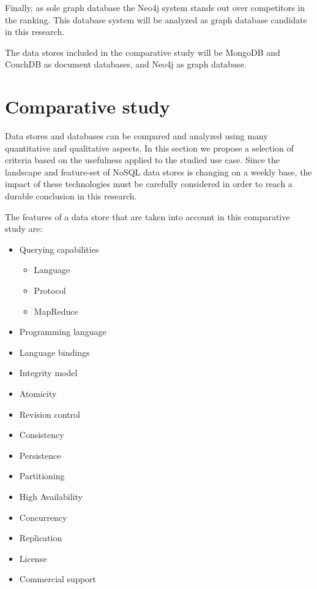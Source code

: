 \clearpage{}
Finally, as sole graph database the Neo4j system \autocite{Neo4j2007} stands out over competitors in the ranking.
This database system will be analyzed as graph database candidate in this research.

The data stores included in the comparative study will be MongoDB and CouchDB as document databases, and Neo4j as graph database.

\section{Comparative study}
\label{sec:comparative-study}

Data stores and databases can be compared and analyzed using many quantitative and qualitative aspects.
In this section we propose a selection of criteria based on the usefulness applied to the studied use case.
Since the landscape and feature-set of NoSQL data stores is changing on a weekly base, the impact of these technologies must be carefully considered in order to reach a durable conclusion in this research.

The features of a data store that are taken into account in this comparative study are:

\begin{itemize}
  \item Querying capabilities
    \begin{itemize}
      \item Language
      \item Protocol
      \item MapReduce
    \end{itemize}

  \item Programming language
  \item Language bindings

  \item Integrity model
  \item Atomicity
  \item Revision control
  \item Consistency

  \item Persistence
  \item Partitioning
  \item High Availability
  \item Concurrency
  \item Replication

  \item License
  \item Commercial support
\end{itemize}

